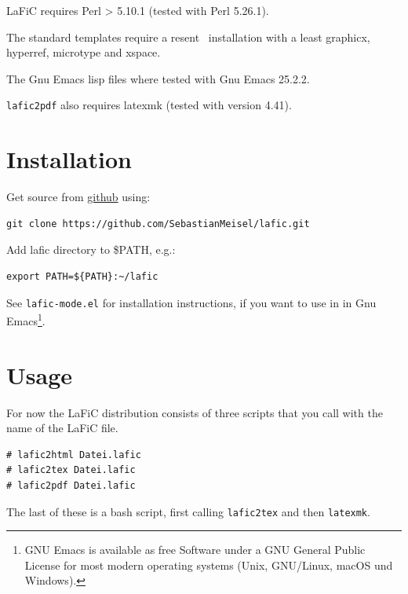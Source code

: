 \documentclass{article}
\begin{document}
{LaFiC requires Perl > 5.10.1 (tested with Perl 5.26.1).\\}

{The standard templates require a resent \XeLaTeX\  installation
with a least graphicx, hyperref, microtype and xspace.\\}

{The Gnu Emacs lisp files where tested with Gnu Emacs 25.2.2.\\}

{\texttt{lafic2pdf} also requires latexmk (tested with version 4.41).\\}

\section{Installation}
\label{installation}

{Get source from \href{https://github.com}{github} using:\\}

\begin{verbatim}
git clone https://github.com/SebastianMeisel/lafic.git
\end{verbatim}


{Add lafic directory to \$PATH, e.g.:\\}

\begin{verbatim}
export PATH=${PATH}:~/lafic
\end{verbatim}


{See \texttt{lafic-mode.el} for installation instructions, if you want
to use in in Gnu Emacs\footnote{GNU Emacs is available as free Software under a GNU General Public License for most modern operating systems (Unix, GNU/Linux, macOS und Windows).}\xspace .\\}

\section{Usage}

{For now the LaFiC distribution consists of three scripts
that you call with the name of the LaFiC file.\\}

\begin{verbatim}
# lafic2html Datei.lafic
# lafic2tex Datei.lafic
# lafic2pdf Datei.lafic
\end{verbatim}


{The last of these is a bash script, first calling \texttt{lafic2tex}
and then \texttt{latexmk}.\\}
\end{document}
